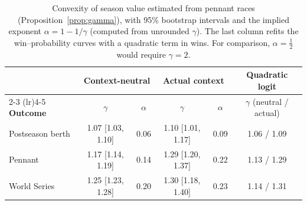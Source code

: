 \documentclass[11pt,letterpaper]{article}
\theoremstyle{plain}
\theoremstyle{definition}
\theoremstyle{remark}
\begin{document}
\begin{table}[htbp]
\centering
\caption{Convexity of season value estimated from pennant races (Proposition~\ref{prop:gamma}), with 95\% bootstrap intervals and the implied exponent $\alpha = 1 - 1/\gamma$ (computed from unrounded $\gamma$). The last column refits the win--probability curves with a quadratic term in wins. For comparison, $\alpha = \tfrac12$ would require $\gamma = 2$.}
\label{tab:gamma}
\footnotesize
\begin{tabular}{@{}lccccc@{}}
\toprule
& \multicolumn{2}{c}{\textbf{Context-neutral}} & \multicolumn{2}{c}{\textbf{Actual context}} & \textbf{Quadratic logit} \\
\cmidrule(lr){2-3} \cmidrule(lr){4-5}
\textbf{Outcome} & $\gamma$ & $\alpha$ & $\gamma$ & $\alpha$ & $\gamma$ (neutral / actual) \\
\midrule
Postseason berth & 1.07 [1.03, 1.10] & 0.06 & 1.10 [1.01, 1.17] & 0.09 & 1.06 / 1.09 \\
Pennant          & 1.17 [1.14, 1.19] & 0.14 & 1.29 [1.20, 1.37] & 0.22 & 1.13 / 1.29 \\
World Series     & 1.25 [1.23, 1.28] & 0.20 & 1.30 [1.18, 1.40] & 0.23 & 1.14 / 1.31 \\
\bottomrule
\end{tabular}
\end{table}
\end{document}
